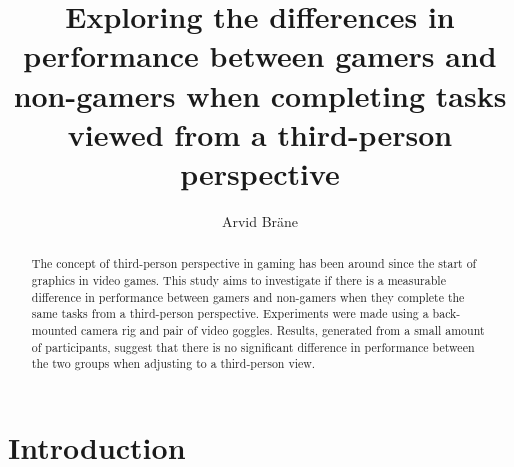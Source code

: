 \documentclass[runningheads,a4paper,oribibl]{llncs}
\begin{document}
\pagestyle{headings}

\mainmatter

\title{Exploring the differences in performance between gamers and non-gamers when completing tasks viewed from a third-person perspective}



\author{Arvid Bräne}


\maketitle


\begin{abstract}
The concept of third-person perspective in gaming has been around since the start of graphics in video games. This study aims to investigate if there is a measurable difference in performance between gamers and non-gamers when they complete the same tasks from a third-person perspective. Experiments were made using a back-mounted camera rig and pair of video goggles. Results, generated from a small amount of participants, suggest that there is no significant difference in performance between the two groups when adjusting to a third-person view.
	


\end{abstract}











\section{Introduction}
\end{document}
